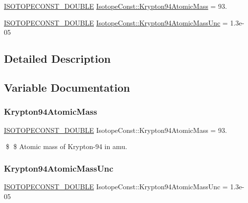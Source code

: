 \begin{DoxyCompactItemize}
\item 
\mbox{\hyperlink{group___isotope_const-_macros_ga8f45a7272ce02c0b4c65c44636ed719a}{I\+S\+O\+T\+O\+P\+E\+C\+O\+N\+S\+T\+\_\+\+D\+O\+U\+B\+LE}} \mbox{\hyperlink{group___isotope_const-_krypton-_kr94_ga3eb972608b314bfd6bc2ec3755de9d35}{Isotope\+Const\+::\+Krypton94\+Atomic\+Mass}} = 93.
\item 
\mbox{\hyperlink{group___isotope_const-_macros_ga8f45a7272ce02c0b4c65c44636ed719a}{I\+S\+O\+T\+O\+P\+E\+C\+O\+N\+S\+T\+\_\+\+D\+O\+U\+B\+LE}} \mbox{\hyperlink{group___isotope_const-_krypton-_kr94_ga6151da0d665c223b872b9caf920ccfc8}{Isotope\+Const\+::\+Krypton94\+Atomic\+Mass\+Unc}} = 1.\+3e-\/05
\end{DoxyCompactItemize}


\subsection{Detailed Description}


\subsection{Variable Documentation}
\mbox{\label{group___isotope_const-_krypton-_kr94_ga3eb972608b314bfd6bc2ec3755de9d35}} 
\subsubsection{\texorpdfstring{Krypton94\+Atomic\+Mass}{Krypton94AtomicMass}}
{\footnotesize\ttfamily \mbox{\hyperlink{group___isotope_const-_macros_ga8f45a7272ce02c0b4c65c44636ed719a}{I\+S\+O\+T\+O\+P\+E\+C\+O\+N\+S\+T\+\_\+\+D\+O\+U\+B\+LE}} Isotope\+Const\+::\+Krypton94\+Atomic\+Mass = 93.}

\$ \$ Atomic mass of Krypton-\/94 in amu. \mbox{\label{group___isotope_const-_krypton-_kr94_ga6151da0d665c223b872b9caf920ccfc8}} 
\subsubsection{\texorpdfstring{Krypton94\+Atomic\+Mass\+Unc}{Krypton94AtomicMassUnc}}
{\footnotesize\ttfamily \mbox{\hyperlink{group___isotope_const-_macros_ga8f45a7272ce02c0b4c65c44636ed719a}{I\+S\+O\+T\+O\+P\+E\+C\+O\+N\+S\+T\+\_\+\+D\+O\+U\+B\+LE}} Isotope\+Const\+::\+Krypton94\+Atomic\+Mass\+Unc = 1.\+3e-\/05}

